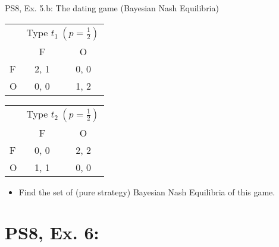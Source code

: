 \begin{frame}{PS8, Ex. 5.b: The dating game (Bayesian Nash Equilibria)}
    \begin{table}
      \begin{tabular}{l|c|c|}
        \multicolumn{1}{c}{} & \multicolumn{2}{c}{Type $t_1\ (p=\frac{1}{2})$} \\
        \multicolumn{1}{c}{} & \multicolumn{1}{c}{F} & \multicolumn{1}{c}{O} \\\cline{2-3}
        F & 2, 1 & 0, 0 \\\cline{2-3}
        O & 0, 0 & 1, 2 \\\cline{2-3}
      \end{tabular}\quad
      \begin{tabular}{l|c|c|}
        \multicolumn{1}{c}{} & \multicolumn{2}{c}{Type $t_2\ (p=\frac{1}{2})$} \\
        \multicolumn{1}{c}{} & \multicolumn{1}{c}{F} & \multicolumn{1}{c}{O} \\\cline{2-3}
        F & 0, 0 & 2, 2 \\\cline{2-3}
        O & 1, 1 & 0, 0 \\\cline{2-3}
      \end{tabular}
    \end{table}
    \begin{itemize}
      \item[(b)] Find the set of (pure strategy) Bayesian Nash Equilibria of this game.
    \end{itemize}
  \begin{multicols}{2}
    \vfill\null\columnbreak
    \vfill\null
  \end{multicols}
\end{frame}



\section{PS8, Ex. 6: }

